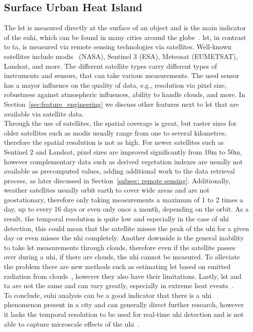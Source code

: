 \subsection{Surface Urban Heat Island}

The \gls{lst} is measured directly at the surface of an object and is the main indicator of the \gls{suhi}, which can be found in many cities around the globe~\cite{peng2012surface}. \gls{lst}, in contrast to \gls{ta}, is measured via remote sensing technologies via satellites. Well-known satellites include \gls{modis}~\cite{didan2021modis} (NASA), Sentinel 3 (ESA), Meteosat (EUMETSAT), Landsat, and more. The different satellite types carry different types of instruments and sensors, that can take various measurements. The used sensor has a mayor influence on the quality of data, e.g., resolution via pixel size, robustness against atmospheric influences, ability to handle clouds, and more. In Section~\ref{sec:feature_engineering} we discuss other features next to \gls{lst} that are available via satellite data.\\
Through the use of satellites, the spatial coverage is great, but raster sizes for older satellites such as \gls{modis} usually range from one to several kilometres, therefore the spatial resolution is not as high. For newer satellites such as Sentinel 2 and Landsat, pixel sizes are improved significantly from 10m to 50m, however complementary data such as derived vegetation indexes are usually not available as precomputed values, adding additional work to the data retrieval process, as later discussed in Section~\ref{subsec: remote sensing}.
Additionally, weather satellites usually orbit earth to cover wide areas and are not geostationary, therefore only taking measurements a maximum of 1 to 2 times a day, up to every 16 days or even only once a month, depending on the orbit. As a result, the temporal resolution is quite low and especially in the case of \gls{uhi} detection, this could mean that the satellite misses the peak of the \gls{uhi} for a given day or even misses the \gls{uhi} completely. Another downside is the general inability to take \gls{lst} measurements through clouds, therefore even if the satellite passes over during a \gls{uhi}, if there are clouds, the \gls{uhi} cannot be measured. To alleviate the problem there are new methods such as estimating \gls{lst} based on emitted radiation from clouds~\cite{zhang2015estimation}, however they also have their limitations. Lastly, \gls{lst} and \gls{ta} are not the same and can vary greatly, especially in extreme heat events~\cite{good2016situ}.\\
To conclude, \gls{suhi} analysis can be a good indicator that there is a \gls{uhi} phenomenon present in a city and can generally direct further research, however it lacks the temporal resolution to be used for real-time \gls{uhi} detection and is not able to capture microscale effects of the \gls{uhi}~\cite{voogt2003thermal, voelkel2017towards}.

